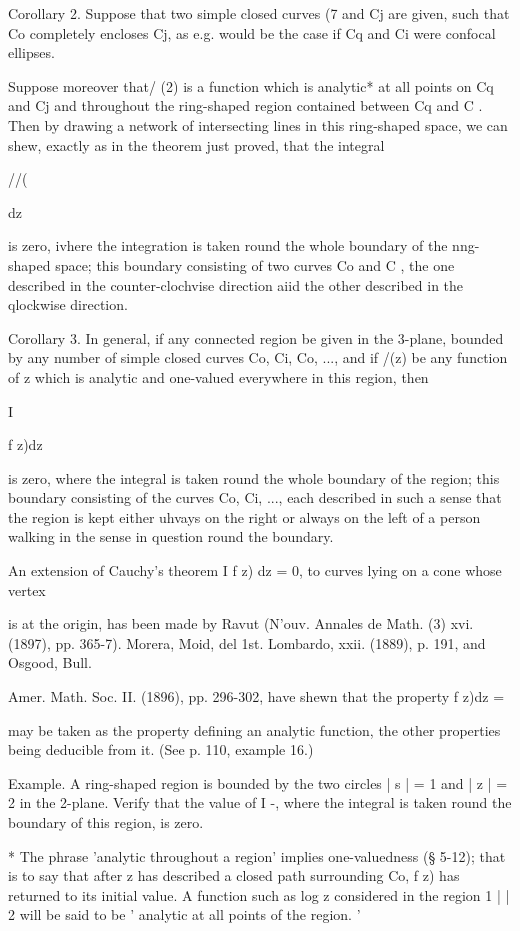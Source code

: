 {Corollary 2. Suppose that two simple closed curves (7 and Cj are
given, such that Co completely encloses Cj, as e.g. would be the case
if Cq and Ci were confocal ellipses.

Suppose moreover that/ (2) is a function which is analytic* at all
points on Cq and Cj and throughout the ring-shaped region contained
between Cq and C . Then by drawing a network of intersecting lines in
this ring-shaped space, we can shew, exactly as in the theorem just
proved, that the integral

//(

dz

is zero, ivhere the integration is taken round the whole boundary of
the nng-shaped space; this boundary consisting of two curves Co and C
, the one described in the counter-clochvise direction aiid the other
described in the qlockwise direction.

Corollary 3. In general, if any connected region be given in the
3-plane, bounded by any number of simple closed curves Co, Ci, Co,
..., and if /(z) be any function of z which is analytic and one-valued
everywhere in this region, then

I

f z)dz

is zero, where the integral is taken round the whole boundary of the
region; this boundary consisting of the curves Co, Ci, ..., each
described in such a sense that the region is kept either uhvays on the
right or always on the left of a person walking in the sense in
question round the boundary.

An extension of Cauchy's theorem I f z) dz = 0, to curves lying on a
cone whose vertex

is at the origin, has been made by Ravut (N'ouv. Annales de Math. (3)
xvi. (1897), pp. 365-7). Morera, Moid, del 1st. Lombardo, xxii.
(1889), p. 191, and Osgood, Bull.

Amer. Math. Soc. II. (1896), pp. 296-302, have shewn that the property
f z)dz =

may be taken as the property defining an analytic function, the other
properties being deducible from it. (See p. 110, example 16.)

Example. A ring-shaped region is bounded by the two circles | s | = 1
and | z | = 2 in the 2-plane. Verify that the value of I -, where the
integral is taken round the boundary of this region, is zero.

* The phrase 'analytic throughout a region' implies one-valuedness (§
5-12); that is to say that after z has described a closed path
surrounding Co, f z) has returned to its initial value. A function
such as log z considered in the region 1 | | 2 will be said to be '
analytic at all points of the region. '

}
